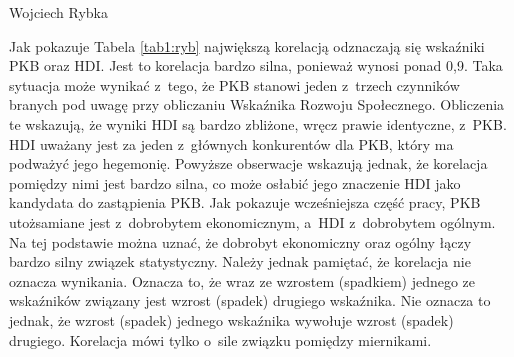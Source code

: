 \begin{artplenv}{Wojciech Rybka}
\begin{table}[H]
	\caption{Zależność pomiędzy danymi otrzymanymi ze wskaźników.
	Źródło: obliczenia własne na podstawie
	\parencite{international_monetary_fund_world_2019a,united_nations_development_programme_human_2019,noauthor_world_2018}.
	}
	\label{tab1:ryb}
\end{table}


%

Jak pokazuje Tabela \ref{tab1:ryb} największą korelacją odznaczają się wskaźniki PKB oraz HDI. Jest to korelacja bardzo silna,
ponieważ wynosi ponad 0,9. Taka sytuacja może wynikać z~tego, że PKB stanowi jeden z~trzech czynników branych pod uwagę
przy obliczaniu Wskaźnika Rozwoju Społecznego. Obliczenia te wskazują, że wyniki HDI są bardzo zbliżone, wręcz prawie
identyczne, z~PKB. HDI uważany jest za jeden z~głównych konkurentów dla PKB, który ma podważyć jego hegemonię. Powyższe
obserwacje wskazują jednak, że korelacja pomiędzy nimi jest bardzo silna, co może osłabić jego znaczenie HDI jako
kandydata do zastąpienia PKB. Jak pokazuje wcześniejsza część pracy, PKB utożsamiane jest z~dobrobytem ekonomicznym,
a~HDI z~dobrobytem ogólnym. Na tej podstawie można uznać, że dobrobyt ekonomiczny oraz ogólny łączy bardzo silny związek
statystyczny. Należy jednak pamiętać, że korelacja nie oznacza wynikania. Oznacza to, że wraz ze wzrostem (spadkiem)
jednego ze wskaźników związany jest wzrost (spadek) drugiego wskaźnika. Nie oznacza to jednak, że wzrost (spadek)
jednego wskaźnika wywołuje wzrost (spadek) drugiego. Korelacja mówi tylko o~sile związku pomiędzy miernikami. 


\end{artplenv}
